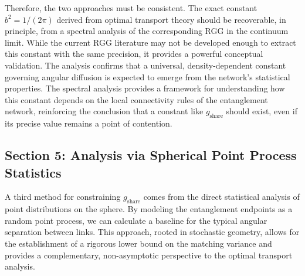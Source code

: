 \documentclass[11pt]{article}
\begin{document}
Therefore, the two approaches must be consistent. The exact constant $b^2 = 1/(2\pi)$ derived from optimal transport theory should be recoverable, in principle, from a spectral analysis of the corresponding RGG in the continuum limit. While the current RGG literature may not be developed enough to extract this constant with the same precision, it provides a powerful conceptual validation. The analysis confirms that a universal, density-dependent constant governing angular diffusion is expected to emerge from the network’s statistical properties. The spectral analysis provides a framework for understanding how this constant depends on the local connectivity rules of the entanglement network, reinforcing the conclusion that a constant like $g_{\mathrm{share}}$ should exist, even if its precise value remains a point of contention.

\subsection*{Section 5: Analysis via Spherical Point Process Statistics}
A third method for constraining $g_{\mathrm{share}}$ comes from the direct statistical analysis of point distributions on the sphere. By modeling the entanglement endpoints as a random point process, we can calculate a baseline for the typical angular separation between links. This approach, rooted in stochastic geometry, allows for the establishment of a rigorous lower bound on the matching variance and provides a complementary, non-asymptotic perspective to the optimal transport analysis.
\end{document}
